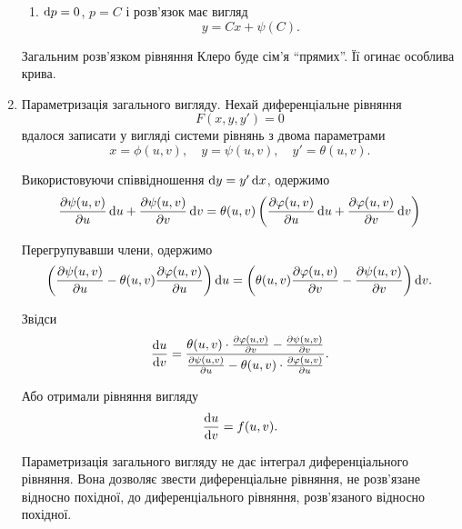 \begin{enumerate}
\begin{enumerate}
		\item $\mathop{}\!\mathrm{d} p = 0$, $p = C$ і розв'язок має вигляд
		\begin{equation*}
			y = C x + \psi(C).
		\end{equation*}
	\end{enumerate}
	
	Загальним розв'язком рівняння Клеро буде сім'я ``прямих''. Її огинає особлива крива.
	
	\item Параметризація загального вигляду. Нехай диференціальне рівняння \[F(x, y, y') = 0\] вдалося записати у вигляді системи рівнянь з двома параметрами
	\begin{equation*}
		x = \phi(u, v), \quad y = \psi(u, v), \quad y' = \theta(u, v).	
	\end{equation*}
	
	Використовуючи співвідношення $\mathop{}\!\mathrm{d} y = y' \mathop{}\!\mathrm{d} x$, одержимо
	\begin{equation*}
		\frac{\partial \psi(u,v)}{\partial u} \mathop{}\!\mathrm{d} u + \frac{\partial \psi(u, v)}{\partial v} \mathop{}\!\mathrm{d} v = \theta(u,v) \left( \frac{\partial \varphi(u,v)}{\partial u} \mathop{}\!\mathrm{d} u + \frac{\partial \varphi(u, v)}{\partial v} \mathop{}\!\mathrm{d} v\right)
	\end{equation*}
	
	Перегрупувавши члени, одержимо
	\begin{equation*}
		\left( \frac{\partial \psi(u,v)}{\partial u} - \theta(u, v) \frac{\partial \varphi(u,v)}{\partial u} \right) \mathop{}\!\mathrm{d} u = \left( \theta(u,v) \frac{\partial \varphi(u, v)}{\partial v} - \frac{\partial \psi(u, v)}{\partial v} \right) \mathop{}\!\mathrm{d} v.
	\end{equation*}
	
	Звідси
	\begin{equation*}
		\frac{\mathop{}\!\mathrm{d} u}{\mathop{}\!\mathrm{d} v} = \frac{\theta(u,v) \cdot \frac{\partial \varphi(u, v)}{\partial v} - \frac{\partial \psi(u, v)}{\partial v}}{\frac{\partial \psi(u,v)}{\partial u} - \theta(u, v) \cdot \frac{\partial \varphi(u,v)}{\partial u}}.
	\end{equation*}

	Або отримали рівняння вигляду
	\begin{equation*}
		\frac{\mathop{}\!\mathrm{d} u}{\mathop{}\!\mathrm{d} v} = f(u, v).
	\end{equation*}

	Параметризація загального вигляду не дає інтеграл диференціального рівняння. Вона дозволяє звести диференціальне рівняння, не роз\-в'яз\-а\-не відносно похідної, до диференціального рівняння, роз\-в'яз\-а\-но\-го відносно похідної.


\end{enumerate}
